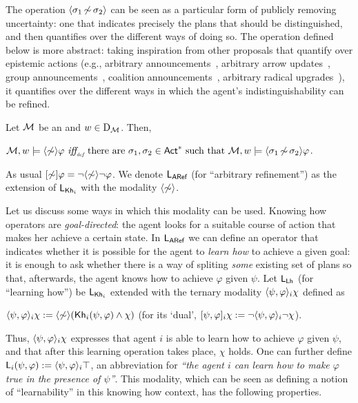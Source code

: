 The operation $\langle \sigma_1{\,\not\sim\,}\sigma_2 \rangle$ can be seen as a particular form of publicly removing uncertainty: one that indicates precisely the plans that should be distinguished, and then quantifies over the different ways of doing so. The operation defined below is more abstract: taking inspiration from other proposals that quantify over epistemic actions (e.g., arbitrary announcements~\cite{BalbianiBDHHL08}, arbitrary arrow updates~\cite{DitmarschHKK17}, group announcements~\cite{GroupAJ}, coalition announcements~\cite{AgotnesD08}, arbitrary radical upgrades~\cite{FI24}), it quantifies over the different ways in which the agent's indistinguishability can be refined. 

\medskip

\begin{definition}\label{def:sem:aref}
Let $\mathcal{M}$ be an \ults and $w\in\operatorname{D}_{\mathcal{M}}$.  %
Then,
\begin{spcenter}
  $\mathcal{M},w\models\langle \not\sim \rangle\varphi\ \mbox{\it iff}_{\mbox{\tiny\it def}} \ \text{there are } \sigma_1,\sigma_2 \in {\rm \sf Act}^* \text{ such that } \mathcal{M},w \models \langle \sigma_1{\,\not\sim\,}\sigma_2 \rangle\varphi$.
\end{spcenter}
As usual $[\not\sim]\varphi = \neg\langle \not\sim \rangle\neg\varphi$. We denote $\mathsf{L_{ARef}}$ (for ``arbitrary refinement'') as the extension of $\mathsf{L}_{{\sf Kh}_i}$ with the modality $\langle \not\sim \rangle$.
\end{definition}

\medskip

Let us discuss some ways in which this modality can be used. Knowing how operators are \emph{goal-directed}: the agent looks for a suitable course of action that makes her achieve a certain state. 
In $\mathsf{L_{ARef}}$ we can define an operator that indicates whether it is possible for the agent to \emph{learn how} to achieve a given goal: it is enough to ask whether there is a way of spliting \emph{some} existing set of plans so that, afterwards, the agent knows how to achieve $\varphi$ given $\psi$. Let $\mathsf{L_{Lh}}$ (for ``learning how'') be $\mathsf{L}_{{\sf Kh}_i}$ extended with the ternary modality $\langle \psi,\varphi \rangle_i\chi$ defined as
\begin{spcenter}
$\langle \psi,\varphi \rangle_i\chi := \langle \not\sim \rangle({\sf Kh}_i(\psi,\varphi) \wedge\chi)$ \qquad (for its `dual', $[\psi,\varphi]_i\chi := \neg\langle \psi,\varphi \rangle_i\neg\chi$).
\end{spcenter}

Thus, $\langle \psi,\varphi \rangle_i\chi$ expresses that agent $i$ is able to learn how to achieve $\varphi$ given $\psi$, and that after this learning operation takes place, $\chi$ holds. One can further define ${\sf L}_i(\psi,\varphi) := \langle \psi,\varphi \rangle_i\top$, an abbreviation for \emph{``the agent $i$ can learn how to make $\varphi$ true in the presence of $\psi$''}. 
This modality, which can be seen as defining a notion of ``learnability'' in this knowing how context, has the following properties.

